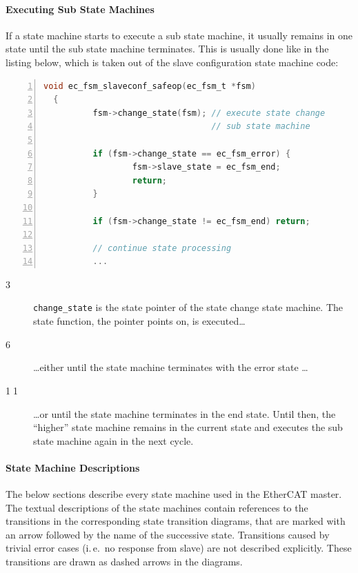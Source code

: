 \documentclass[a4paper,12pt,BCOR6mm,bibtotoc,idxtotoc]{scrbook}
\newcommand{\linenum}[1]{\normalfont\textcircled{\tiny #1}}
\begin{document}
\paragraph{Executing Sub State Machines}

If a state machine starts to execute a sub state machine, it usually
remains in one state until the sub state machine terminates. This is
usually done like in the listing below, which is taken out of the
slave configuration state machine code:

\begin{lstlisting}[gobble=2,language=C,numbers=left]
  void ec_fsm_slaveconf_safeop(ec_fsm_t *fsm)
  {
          fsm->change_state(fsm); // execute state change
                                  // sub state machine

          if (fsm->change_state == ec_fsm_error) {
                  fsm->slave_state = ec_fsm_end;
                  return;
          }

          if (fsm->change_state != ec_fsm_end) return;

          // continue state processing
          ...
\end{lstlisting}

\begin{description}

\item[\linenum{3}] \lstinline+change_state+ is the state pointer of the state
change state machine. The state function, the pointer points on, is
executed\ldots

\item[\linenum{6}] \ldots either until the state machine terminates with the
error state \ldots

\item[\linenum{11}] \ldots or until the state machine terminates in the end
state. Until then, the ``higher'' state machine remains in the current state
and executes the sub state machine again in the next cycle.

\end{description}

\paragraph{State Machine Descriptions}

The below sections describe every state machine used in the EtherCAT master.
The textual descriptions of the state machines contain references to the
transitions in the corresponding state transition diagrams, that are marked
with an arrow followed by the name of the successive state. Transitions caused
by trivial error cases (i.\,e.\ no response from slave) are not described
explicitly. These transitions are drawn as dashed arrows in the diagrams.
\end{document}
